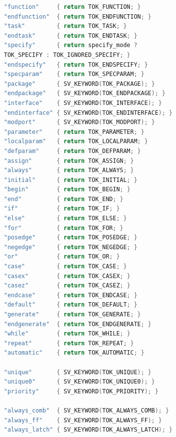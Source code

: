 \documentclass[11pt]{report}
\begin{document}
\begin{itemize}
\begin{lstlisting}[language=C++]
"function"     { return TOK_FUNCTION; }
"endfunction"  { return TOK_ENDFUNCTION; }
"task"         { return TOK_TASK; }
"endtask"      { return TOK_ENDTASK; }
"specify"      { return specify_mode ? 
TOK_SPECIFY : TOK_IGNORED_SPECIFY; }
"endspecify"   { return TOK_ENDSPECIFY; }
"specparam"    { return TOK_SPECPARAM; }
"package"      { SV_KEYWORD(TOK_PACKAGE); }
"endpackage"   { SV_KEYWORD(TOK_ENDPACKAGE); }
"interface"    { SV_KEYWORD(TOK_INTERFACE); }
"endinterface" { SV_KEYWORD(TOK_ENDINTERFACE); }
"modport"      { SV_KEYWORD(TOK_MODPORT); }
"parameter"    { return TOK_PARAMETER; }
"localparam"   { return TOK_LOCALPARAM; }
"defparam"     { return TOK_DEFPARAM; }
"assign"       { return TOK_ASSIGN; }
"always"       { return TOK_ALWAYS; }
"initial"      { return TOK_INITIAL; }
"begin"	       { return TOK_BEGIN; }
"end"          { return TOK_END; }
"if"           { return TOK_IF; }
"else"         { return TOK_ELSE; }
"for"          { return TOK_FOR; }
"posedge"      { return TOK_POSEDGE; }
"negedge"      { return TOK_NEGEDGE; }
"or"           { return TOK_OR; }
"case"         { return TOK_CASE; }
"casex"        { return TOK_CASEX; }
"casez"        { return TOK_CASEZ; }
"endcase"      { return TOK_ENDCASE; }
"default"      { return TOK_DEFAULT; }
"generate"     { return TOK_GENERATE; }
"endgenerate"  { return TOK_ENDGENERATE; }
"while"        { return TOK_WHILE; }
"repeat"       { return TOK_REPEAT; }
"automatic"    { return TOK_AUTOMATIC; }

"unique"       { SV_KEYWORD(TOK_UNIQUE); }
"unique0"      { SV_KEYWORD(TOK_UNIQUE0); }
"priority"     { SV_KEYWORD(TOK_PRIORITY); }

"always_comb"  { SV_KEYWORD(TOK_ALWAYS_COMB); }
"always_ff"    { SV_KEYWORD(TOK_ALWAYS_FF); }
"always_latch" { SV_KEYWORD(TOK_ALWAYS_LATCH); }

\end{lstlisting}


\end{itemize}
\end{document}
